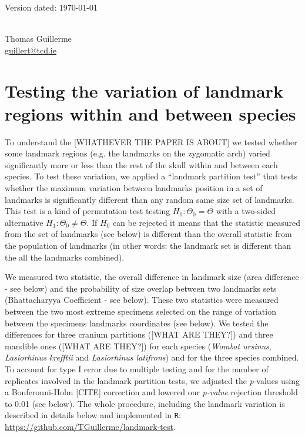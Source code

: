 \documentclass[a4paper,11pt]{article}
\begin{document}
\begin{flushright}
Version dated: \today
\end{flushright}
\begin{center}

\\
\bigskip
Thomas Guillerme\\\href{guillert@tcd.ie}{guillert@tcd.ie}

\end{center}

\section{Testing the variation of landmark regions within and between species}

To understand the [WHATHEVER THE PAPER IS ABOUT] we tested whether some landmark regions (e.g. the landmarks on the zygomatic arch) varied significantly more or less than the rest of the skull within and between each species.
To test these variation, we applied a ``landmark partition test'' that tests whether the maximum variation between landmarks position in a set of landmarks is significantly different than any random same size set of landmarks.
This test is a kind of permutation test testing $H_{0}: \Theta_{0} = \Theta$ with a two-sided alternative $H_{1}: \Theta_{0} \neq \Theta$.
If $H_{0}$ can be rejected it means that the statistic measured from the set of landmarks (see below) is different than the overall statistic from the population of landmarks (in other words: the landmark set is different than the all the landmarks combined).

We measured two statistic, the overall difference in landmark size (area difference - see below) and the probability of size overlap between two landmarks sets (Bhattacharyya Coefficient - see below).
These two statistics were measured between the two most extreme specimens selected on the range of variation between the specimens landmarks coordinates (see below).
We tested the differences for three cranium partitions ([WHAT ARE THEY?]) and three mandible ones ([WHAT ARE THEY?]) for each species (\textit{Wombat ursinus}, \textit{Lasiorhinus krefftii} and \textit{Lasiorhinus latifrons}) and for the three species combined.
To account for type I error due to multiple testing and for the number of replicates involved in the landmark partition tests, we adjusted the \textit{p}-values using a Bonferonni-Holm [CITE] correction and lowered our \textit{p-value} rejection threshold to 0.01 (see below).
The whole procedure, including the landmark variation is described in details below and implemented in \texttt{R}: \url{https://github.com/TGuillerme/landmark-test}.
\end{document}
